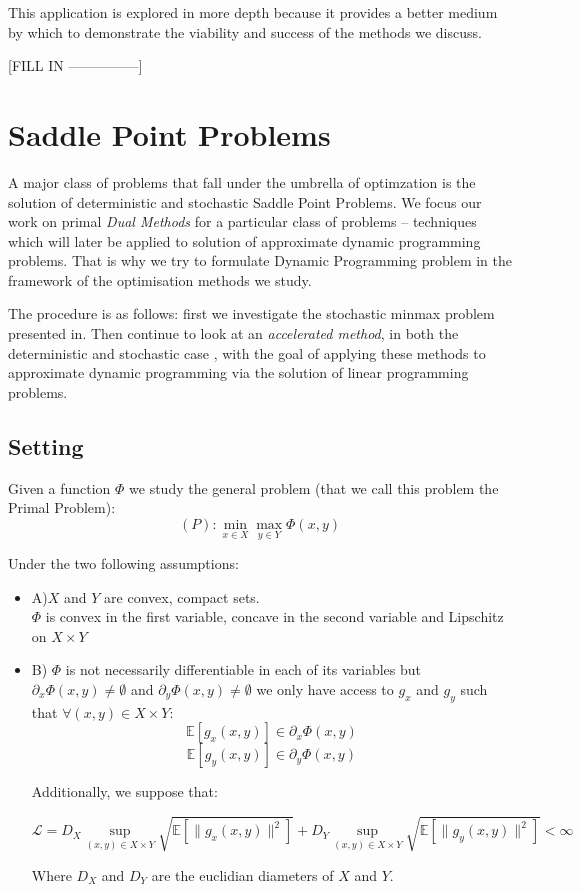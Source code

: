 \documentclass[12pt,reqno]{amsart}
\numberwithin{equation}{section}
\begin{document}
This application is explored in more depth because it provides a better medium by which to demonstrate the viability and success of the methods we discuss.

[FILL IN ---------------]


\section{Saddle Point Problems}

A major class of problems that fall under the umbrella of optimzation is the solution of deterministic and stochastic Saddle Point Problems. We focus our work on primal \emph{Dual Methods} for a particular class of problems -- techniques which will later be applied to solution of approximate dynamic programming problems.
That is why we try to formulate Dynamic Programming problem in the framework of the optimisation methods we study.

The procedure is as follows: first we investigate the stochastic minmax problem presented in\cite{NemirovskiRubinstein}. Then continue to look at an \emph{accelerated method}, in both the deterministic \cite{ChambollePock} and stochastic case \cite{ChenLanOuyang}, with the goal of applying these methods to approximate dynamic programming via the solution of linear programming problems.

\subsection{Setting}

Given a function $\Phi$ we study the general problem (that we call this problem the Primal Problem):
$$
\boxed{ (P): \min_{x \in X}\max_{y \in Y} \Phi(x,y) }
$$

Under the two following assumptions:

\begin{itemize}
\item A)$X$ and $Y$ are convex, compact sets.\\ $\Phi$ is convex in the first variable, concave in the second variable and Lipschitz on $X \times Y$
\item B) $\Phi$ is not necessarily differentiable in each of its variables but $\partial_{x} \Phi(x,y) \neq  \emptyset $ and $\partial_{y} \Phi(x,y) \neq  \emptyset $
 we only have access to $g_{x}$ and $g_{y}$ such that $\forall (x,y) \in X \times Y$: \\
$$\mathbb{E}[g_{x}(x,y)] \in \partial_{x} \Phi(x,y) $$
$$\mathbb{E}[g_{y}(x,y)] \in \partial_{y} \Phi(x,y) $$

Additionally, we suppose that:

$$
\mathcal{L} = D_{X} \sup_{(x,y) \in X \times Y} \sqrt{\mathbb{E}[\lVert g_{x}(x,y) \rVert^{2}]}+ D_{Y} \sup_{(x,y) \in X \times Y}\sqrt{\mathbb{E}[\lVert g_{y}(x,y) \rVert^{2}]} < \infty
$$

Where $D_{X}$ and $D_{Y}$ are the euclidian diameters of $X$ and $Y$.

\end{itemize}
\end{document}
